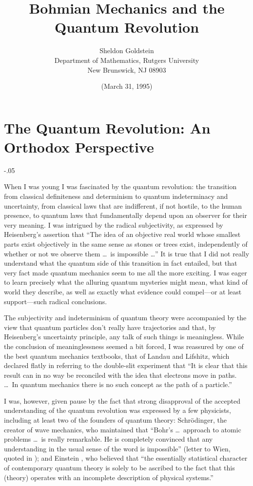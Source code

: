 \documentclass[12pt]{article}
\begin{document}
\title{Bohmian Mechanics and the Quantum Revolution}

\author{Sheldon Goldstein\\
Department of Mathematics, Rutgers University\\ New Brunswick, NJ
08903}
\date{(March 31, 1995)}
\maketitle


\section{The Quantum Revolution: An Orthodox Perspective}
\openup-.05\jot

When I was young I was fascinated by the quantum revolution: the transition
{}from classical definiteness and determinism to quantum indeterminacy and
uncertainty, from classical laws that are indifferent, if not hostile, to
the human presence, to quantum laws that fundamentally depend upon an
observer for their very meaning. I was intrigued by the radical
subjectivity, as expressed by Heisenberg's assertion \cite{Heisenberg} that
``The idea of an objective real world whose smallest parts exist
objectively in the same sense as stones or trees exist, independently of
whether or not we observe them \dots\  is impossible \dots''  It is true that I
did not really understand what the quantum side of this transition in fact
entailed, but that very fact made quantum mechanics seem to me all the more
exciting. I was eager to learn precisely what the alluring quantum
mysteries might mean, what kind of world they describe, as well as exactly
what evidence could compel---or at least support---such radical
conclusions.

The subjectivity and indeterminism of quantum theory were accompanied by
the view that quantum particles don't really have trajectories and that, by
Heisenberg's uncertainty principle, any talk of such things is meaningless.
While the conclusion of meaninglessness seemed a bit forced, I was
reassured by one of the best quantum mechanics textbooks, that of Landau
and Lifshitz, which declared flatly in referring to the double-slit
experiment that \cite{LL} ``It is clear that this result can in no way be
reconciled with the idea that electrons move in paths. \dots\ In quantum
mechanics there is no such concept as the path of a particle.''

I was, however, given pause by the fact that strong disapproval of the
accepted understanding of the quantum revolution was expressed by a few
physicists, including at least two of the founders of quantum theory:
Schr\"odinger, the creator of wave mechanics, who maintained that ``Bohr's
\dots\  approach to atomic problems \dots\   is really remarkable. He is
completely
convinced that any understanding in the usual sense of the word is
impossible'' (letter to Wien, quoted in \cite{Moore}); and Einstein
\cite{Einstein}, who believed that ``the essentially statistical character
of contemporary quantum theory is solely to be ascribed to the fact that
this (theory) operates with an incomplete description of physical
systems.''
\end{document}
